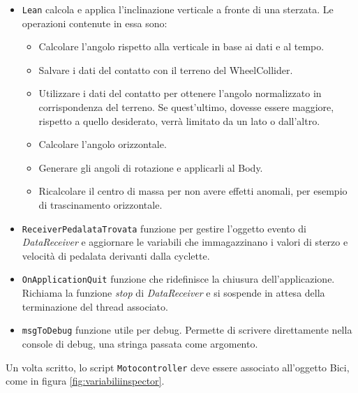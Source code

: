 \begin{itemize}
\begin{itemize}
		\end{itemize}
		
		\item \texttt{Lean} calcola e applica l’inclinazione verticale a fronte di una sterzata. Le operazioni contenute in essa sono:
		\begin{itemize}
			\item Calcolare l’angolo rispetto alla verticale in base ai dati e al tempo.
			\item Salvare i dati del contatto con il terreno del WheelCollider.
			\item Utilizzare i dati del contatto per ottenere l’angolo normalizzato in corrispondenza del terreno. Se quest’ultimo, dovesse essere maggiore, rispetto a quello desiderato, verrà limitato da un lato o dall’altro.
			\item Calcolare l’angolo orizzontale.
			\item Generare gli angoli di rotazione e applicarli al Body.
			\item Ricalcolare il centro di massa per non avere effetti anomali, per esempio di trascinamento orizzontale.
		\end{itemize}
		
		\item \texttt{ReceiverPedalataTrovata} funzione per gestire l'oggetto evento di \textit{DataReceiver} e aggiornare le variabili che immagazzinano i valori di sterzo e velocità di pedalata derivanti dalla cyclette.
		\item \texttt{OnApplicationQuit} funzione che ridefinisce la chiusura dell'applicazione. Richiama la funzione \textit{stop} di \textit{DataReceiver} e si sospende in attesa della terminazione del thread associato.
		\item \texttt{msgToDebug} funzione utile per debug. Permette di scrivere direttamente nella console di debug, una stringa passata come argomento.
	
\end{itemize}

\noindent Un volta scritto, lo script \texttt{Motocontroller} deve essere associato all'oggetto Bici, come in figura \ref{fig:variabiliinspector}. 

